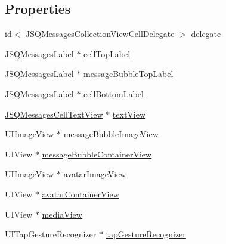 \subsection*{Properties}
\begin{DoxyCompactItemize}
\item 
id$<$ \hyperlink{protocol_j_s_q_messages_collection_view_cell_delegate-p}{J\+S\+Q\+Messages\+Collection\+View\+Cell\+Delegate} $>$ \hyperlink{interface_j_s_q_messages_collection_view_cell_a4b7a40e8a0fc1a0e32c8817286385737}{delegate}
\item 
\hyperlink{interface_j_s_q_messages_label}{J\+S\+Q\+Messages\+Label} $\ast$ \hyperlink{interface_j_s_q_messages_collection_view_cell_aa80fd02c40852bdcb3a0ff5b8e91a650}{cell\+Top\+Label}
\item 
\hyperlink{interface_j_s_q_messages_label}{J\+S\+Q\+Messages\+Label} $\ast$ \hyperlink{interface_j_s_q_messages_collection_view_cell_a98c5acf6e191c92bef28da48b14015b0}{message\+Bubble\+Top\+Label}
\item 
\hyperlink{interface_j_s_q_messages_label}{J\+S\+Q\+Messages\+Label} $\ast$ \hyperlink{interface_j_s_q_messages_collection_view_cell_a324cc242829d32cc3662bd606dd15994}{cell\+Bottom\+Label}
\item 
\hyperlink{interface_j_s_q_messages_cell_text_view}{J\+S\+Q\+Messages\+Cell\+Text\+View} $\ast$ \hyperlink{interface_j_s_q_messages_collection_view_cell_ac6168dfa70a2239ff4633552c5bfe87a}{text\+View}
\item 
U\+I\+Image\+View $\ast$ \hyperlink{interface_j_s_q_messages_collection_view_cell_a3488fe5544e3f4f81bd903526170dcbc}{message\+Bubble\+Image\+View}
\item 
U\+I\+View $\ast$ \hyperlink{interface_j_s_q_messages_collection_view_cell_a0944e4a1d12b598eef21a2c158cef6e8}{message\+Bubble\+Container\+View}
\item 
U\+I\+Image\+View $\ast$ \hyperlink{interface_j_s_q_messages_collection_view_cell_a23cc2af0baa373c2c6712d399ac88999}{avatar\+Image\+View}
\item 
U\+I\+View $\ast$ \hyperlink{interface_j_s_q_messages_collection_view_cell_a5cd207504172b57ba6942158dc46e294}{avatar\+Container\+View}
\item 
U\+I\+View $\ast$ \hyperlink{interface_j_s_q_messages_collection_view_cell_afa76abf130341fe6e18db8b544f22282}{media\+View}
\item 
U\+I\+Tap\+Gesture\+Recognizer $\ast$ \hyperlink{interface_j_s_q_messages_collection_view_cell_a64f75d9084b7476a7a2646b14eff105a}{tap\+Gesture\+Recognizer}
\end{DoxyCompactItemize}


